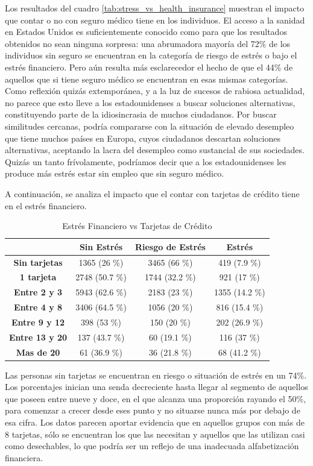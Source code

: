 \documentclass[a4paper, 11pt]{article}
\begin{document}
Los resultados del cuadro \ref{tab:stress_vs_health_insurance} muestran el 
impacto que contar o no con seguro médico tiene en los individuos. El acceso a
la sanidad en Estados Unidos es suficientemente conocido como para que los 
resultados obtenidos no sean ninguna sorpresa: una abrumadora mayoría del 72\%
de los individuos sin seguro se encuentran en la categoría de riesgo de estrés
o bajo el estrés financiero. Pero aún resulta más esclarecedor el hecho de que 
el 44\% de aquellos que si tiene seguro médico se encuentran en esas mismas 
categorías. Como reflexión quizás extemporánea, y a la luz de sucesos de 
rabiosa actualidad, no parece que esto lleve a los estadounidenses a buscar
soluciones alternativas, constituyendo parte de la idiosincrasia de muchos 
ciudadanos. Por buscar similitudes cercanas, podría compararse con la situación
de elevado desempleo que tiene muchos países en Europa, cuyos ciudadanos descartan
soluciones alternativas, aceptando la lacra del desempleo como sustancial de sus
sociedades. Quizás un tanto frívolamente, podríamos decir que a los estadounidenses les produce más estrés estar sin empleo que sin seguro médico.

A continuación, se analiza el impacto que el contar con tarjetas de crédito
tiene en el estrés financiero. 

\begin{table}[ht]
\centering
\begin{tabular}{cccc}
\toprule
 & \textbf{Sin Estrés} & \textbf{Riesgo de Estrés} & \textbf{Estrés}\\
\midrule
\textbf{Sin tarjetas } & 1365 (26 \%) &	3465 (66 \%) &	419 (7.9 \%) \\
\textbf{1 tarjeta} & 2748 (50.7 \%) &	1744 (32.2 \%) &	921 (17 \%)\\
\textbf{Entre 2 y 3 } & 5943 (62.6 \%) &	2183 (23 \%) &	1355 (14.2 \%)\\
\textbf{Entre 4 y 8 } & 3406 (64.5 \%) &	1056 (20 \%) &	816 (15.4 \%)\\
\textbf{Entre 9 y 12} & 398 (53 \%) &	150 (20 \%) &	202 (26.9 \%)\\
\textbf{Entre 13 y 20} & 137 (43.7 \%) &	60 (19.1 \%) &	116 (37 \%) \\
\textbf{Mas de 20} & 61 (36.9 \%) &	36 (21.8 \%) &	68 (41.2 \%)\\
\bottomrule
\end{tabular}
\caption{Estrés Financiero vs Tarjetas de Crédito}
\label{tab:stress_vs_credit_card}
\end{table}
Las personas sin tarjetas se encuentran en riesgo o situación de estrés en
un 74\%. Los porcentajes inician una senda decreciente hasta llegar al 
segmento de aquellos que poseen entre nueve y doce, en el que alcanza una 
proporción rayando el 50\%, para comenzar a crecer desde eses punto y no 
situarse nunca más por debajo de esa cifra. Los datos parecen aportar evidencia
que en aquellos grupos con más de 8 tarjetas, sólo se encuentran los que las 
necesitan y aquellos que las utilizan casi como desechables, lo que podría ser
un reflejo de una inadecuada alfabetización financiera.
\end{document}
